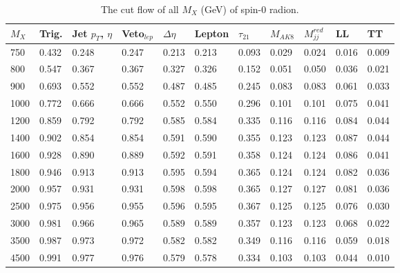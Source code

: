 \begin{table}[h!]
  \begin{center}
    \begin{tabular}{lllllllllll}
    $M_X$ & Trig. & Jet $p_T$, $\eta$ & Veto$_{lep}$ & $\Delta \eta$ & Lepton & $\tau _{21}$ & $M_{AK8}$ & $M^{red}_{jj}$ & LL & TT\\
    \hline
750 & 0.432 & 0.248 & 0.247 & 0.213 & 0.213 & 0.093 & 0.029 & 0.024 & 0.016 & 0.009 \\
800 & 0.547 & 0.367 & 0.367 & 0.327 & 0.326 & 0.152 & 0.051 & 0.050 & 0.036 & 0.021 \\
900 & 0.693 & 0.552 & 0.552 & 0.487 & 0.485 & 0.245 & 0.083 & 0.083 & 0.061 & 0.033 \\
1000 & 0.772 & 0.666 & 0.666 & 0.552 & 0.550 & 0.296 & 0.101 & 0.101 & 0.075 & 0.041 \\
1200 & 0.859 & 0.792 & 0.792 & 0.585 & 0.584 & 0.335 & 0.116 & 0.116 & 0.084 & 0.044 \\
1400 & 0.902 & 0.854 & 0.854 & 0.591 & 0.590 & 0.355 & 0.123 & 0.123 & 0.087 & 0.044 \\
1600 & 0.928 & 0.890 & 0.889 & 0.592 & 0.591 & 0.358 & 0.124 & 0.124 & 0.086 & 0.041 \\
1800 & 0.946 & 0.913 & 0.913 & 0.595 & 0.594 & 0.365 & 0.124 & 0.124 & 0.082 & 0.036 \\
2000 & 0.957 & 0.931 & 0.931 & 0.598 & 0.598 & 0.365 & 0.127 & 0.127 & 0.081 & 0.036 \\
2500 & 0.975 & 0.956 & 0.955 & 0.596 & 0.595 & 0.367 & 0.125 & 0.125 & 0.076 & 0.030 \\
3000 & 0.981 & 0.966 & 0.965 & 0.589 & 0.589 & 0.357 & 0.123 & 0.123 & 0.068 & 0.022 \\
3500 & 0.987 & 0.973 & 0.972 & 0.582 & 0.582 & 0.349 & 0.116 & 0.116 & 0.059 & 0.018 \\
4500 & 0.991 & 0.977 & 0.976 & 0.579 & 0.578 & 0.334 & 0.103 & 0.103 & 0.044 & 0.010 \\
\hline
    \end{tabular}
  \end{center}
	
  \caption{The cut flow of all $M_X$ (GeV) of spin-0 radion.}
\end{table} 

